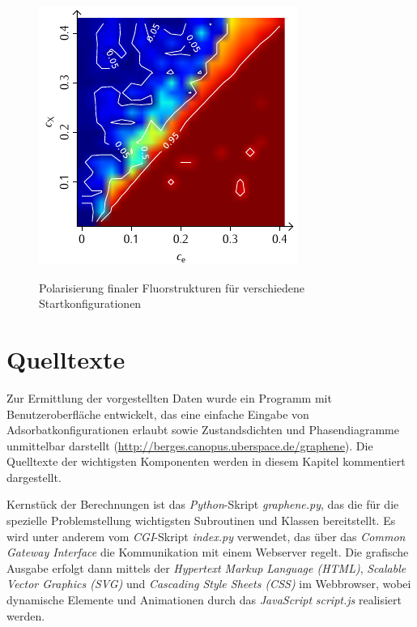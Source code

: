 \documentclass[a4paper, 10pt, twoside, openany]{book} %
\begin{document}
\begin{figure}
\begin{minipage}[t]{0.48\textwidth}
			\label{F_individual_P}
		\end{minipage}
		\hfill
		\begin{minipage}[t]{0.48\textwidth}
			\includegraphics[width=\textwidth]{Abbildungen/Phasendiagramme/Konturen/F_penalty_individual_P.pdf}
			\label{F_penalty_individual_P}
		\end{minipage}
		\caption[Polarisierung finaler Fluorstrukturen]{Polarisierung finaler Fluorstrukturen für verschiedene Startkonfigurationen}
		\label{F_P}
	\end{figure}
	
	\chapter{Quelltexte}
	
	Zur Ermittlung der vorgestellten Daten wurde ein Programm mit Benutzeroberfläche entwickelt, das eine einfache Eingabe von Adsorbatkonfigurationen erlaubt sowie Zustandsdichten und Phasendiagramme unmittelbar darstellt (\url{http://berges.canopus.uberspace.de/graphene}). Die Quelltexte der wichtigsten Komponenten werden in diesem Kapitel kommentiert dargestellt.
	
	Kernstück der Berechnungen ist das \emph{Python}-Skript \emph{graphene.py}, das die für die spezielle Problemstellung wichtigsten Subroutinen und Klassen bereitstellt. Es wird unter anderem vom \emph{CGI}-Skript \emph{index.py} verwendet, das über das \emph{Common Gateway Interface} die Kommunikation mit einem Webserver regelt. Die grafische Ausgabe erfolgt dann mittels der \emph{Hypertext Markup Language (HTML)}, \emph{Scalable Vector Graphics (SVG)} und \emph{Cascading Style Sheets (CSS)} im Webbrowser, wobei dynamische Elemente und Animationen durch das \emph{JavaScript} \emph{script.js} realisiert werden.
	
\end{document}
